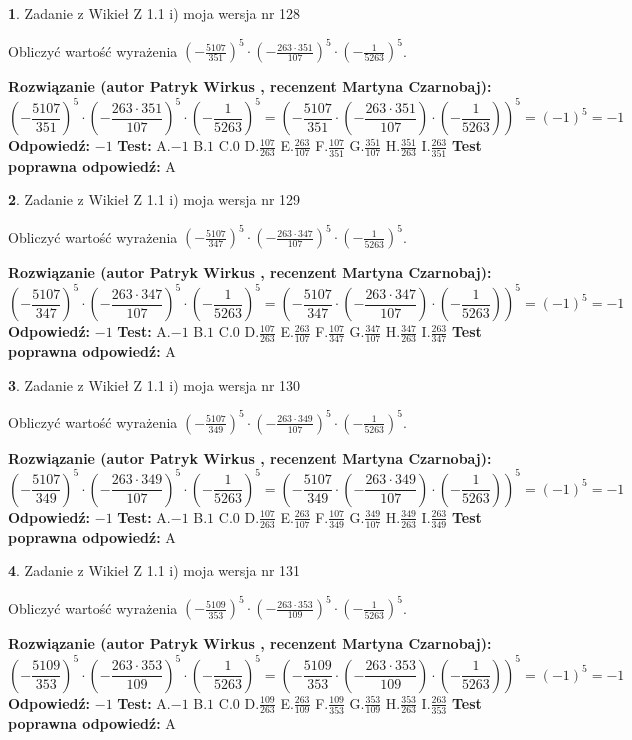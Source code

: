\documentclass[12pt, a4paper]{article}
\theoremstyle{definition} %
\newtheorem{zad}{}
\newcommand{\zadStart}[1]{\begin{zad}#1\newline}
\newcommand{\zadStop}{\end{zad}}
\newcommand{\rozwStart}[2]{\noindent \textbf{Rozwiązanie (autor #1 , recenzent #2): }\newline}
\newcommand{\rozwStop}{\newline}
\newcommand{\odpStart}{\noindent \textbf{Odpowiedź:}\newline}
\newcommand{\odpStop}{\newline}
\newcommand{\testStart}{\noindent \textbf{Test:}\newline}
\newcommand{\testStop}{\newline}
\newcommand{\kluczStart}{\noindent \textbf{Test poprawna odpowiedź:}\newline}
\newcommand{\kluczStop}{\newline}
\begin{document}
\zadStart{Zadanie z Wikieł Z 1.1 i) moja wersja nr 128}

Obliczyć wartość wyrażenia $(-\frac{5107}{351})^{5} \cdot (-\frac{263 \cdot 351}{107})^{5} \cdot (-\frac{1}{5263})^{5}$.
\zadStop
\rozwStart{Patryk Wirkus}{Martyna Czarnobaj}
$$(-\frac{5107}{351})^{5} \cdot (-\frac{263 \cdot 351}{107})^{5} \cdot (-\frac{1}{5263})^{5} = (-\frac{5107}{351} \cdot (-\frac{263 \cdot 351}{107}) \cdot (-\frac{1}{5263}))^{5} = (-1)^{5} = -1$$
\rozwStop
\odpStart
$-1$
\odpStop
\testStart
A.$-1$ B.$1$ C.$0$ D.$\frac{107}{263}$ E.$\frac{263}{107}$
F.$\frac{107}{351}$ G.$\frac{351}{107}$
H.$\frac{351}{263}$
I.$\frac{263}{351}$
\testStop
\kluczStart
A
\kluczStop



\zadStart{Zadanie z Wikieł Z 1.1 i) moja wersja nr 129}

Obliczyć wartość wyrażenia $(-\frac{5107}{347})^{5} \cdot (-\frac{263 \cdot 347}{107})^{5} \cdot (-\frac{1}{5263})^{5}$.
\zadStop
\rozwStart{Patryk Wirkus}{Martyna Czarnobaj}
$$(-\frac{5107}{347})^{5} \cdot (-\frac{263 \cdot 347}{107})^{5} \cdot (-\frac{1}{5263})^{5} = (-\frac{5107}{347} \cdot (-\frac{263 \cdot 347}{107}) \cdot (-\frac{1}{5263}))^{5} = (-1)^{5} = -1$$
\rozwStop
\odpStart
$-1$
\odpStop
\testStart
A.$-1$ B.$1$ C.$0$ D.$\frac{107}{263}$ E.$\frac{263}{107}$
F.$\frac{107}{347}$ G.$\frac{347}{107}$
H.$\frac{347}{263}$
I.$\frac{263}{347}$
\testStop
\kluczStart
A
\kluczStop



\zadStart{Zadanie z Wikieł Z 1.1 i) moja wersja nr 130}

Obliczyć wartość wyrażenia $(-\frac{5107}{349})^{5} \cdot (-\frac{263 \cdot 349}{107})^{5} \cdot (-\frac{1}{5263})^{5}$.
\zadStop
\rozwStart{Patryk Wirkus}{Martyna Czarnobaj}
$$(-\frac{5107}{349})^{5} \cdot (-\frac{263 \cdot 349}{107})^{5} \cdot (-\frac{1}{5263})^{5} = (-\frac{5107}{349} \cdot (-\frac{263 \cdot 349}{107}) \cdot (-\frac{1}{5263}))^{5} = (-1)^{5} = -1$$
\rozwStop
\odpStart
$-1$
\odpStop
\testStart
A.$-1$ B.$1$ C.$0$ D.$\frac{107}{263}$ E.$\frac{263}{107}$
F.$\frac{107}{349}$ G.$\frac{349}{107}$
H.$\frac{349}{263}$
I.$\frac{263}{349}$
\testStop
\kluczStart
A
\kluczStop



\zadStart{Zadanie z Wikieł Z 1.1 i) moja wersja nr 131}

Obliczyć wartość wyrażenia $(-\frac{5109}{353})^{5} \cdot (-\frac{263 \cdot 353}{109})^{5} \cdot (-\frac{1}{5263})^{5}$.
\zadStop
\rozwStart{Patryk Wirkus}{Martyna Czarnobaj}
$$(-\frac{5109}{353})^{5} \cdot (-\frac{263 \cdot 353}{109})^{5} \cdot (-\frac{1}{5263})^{5} = (-\frac{5109}{353} \cdot (-\frac{263 \cdot 353}{109}) \cdot (-\frac{1}{5263}))^{5} = (-1)^{5} = -1$$
\rozwStop
\odpStart
$-1$
\odpStop
\testStart
A.$-1$ B.$1$ C.$0$ D.$\frac{109}{263}$ E.$\frac{263}{109}$
F.$\frac{109}{353}$ G.$\frac{353}{109}$
H.$\frac{353}{263}$
I.$\frac{263}{353}$
\testStop
\kluczStart
A
\kluczStop
\end{document}
